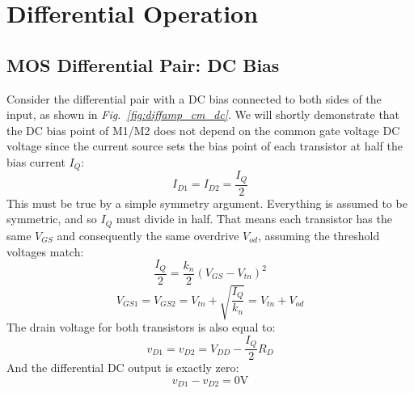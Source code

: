 \newpage
\section{Differential Operation}
\subsection{MOS Differential Pair:  DC Bias}
Consider the differential pair with a DC bias connected to both sides of the input, as shown in \emph{Fig.~\ref{fig:diffamp_cm_dc}}.  We will shortly demonstrate that the DC bias point of M1/M2 does not depend on the common gate voltage DC voltage since the current source sets the bias point of each transistor at half the bias current $I_Q$:
    \begin{equation} 
        {I_{D1}} = {I_{D2}} = \frac{I_Q}{2}
    \end{equation}
This must be true by a simple symmetry argument. Everything is assumed to be symmetric, and so $I_Q$ must divide in half.  That means each transistor has the same $V_{GS}$ and consequently the same overdrive $V_{od}$, assuming the threshold voltages match:
    \begin{equation} 
        \frac{I_Q}{2} = \frac{{{k_n}}}{2}{\left( {{V_{GS}} - {V_{tn}}} \right)^2}
    \end{equation}
    \begin{equation}
        {V_{GS1}} = {V_{GS2}} = {V_{tn}} + \sqrt {\frac{I_Q}{{{k_n}}}}   = V_{tn} + V_{od}
    \end{equation}
The drain voltage for both transistors is also equal to:
    \begin{equation}
        {v_{D1}} = {v_{D2}} = {V_{DD}} - \frac{I_Q}{2}{R_D}  
    \end{equation}
And the differential DC output is exactly zero:
    \begin{equation}
        {v_{D1}} - {v_{D2}} = 0\mathrm{V}
    \end{equation}
